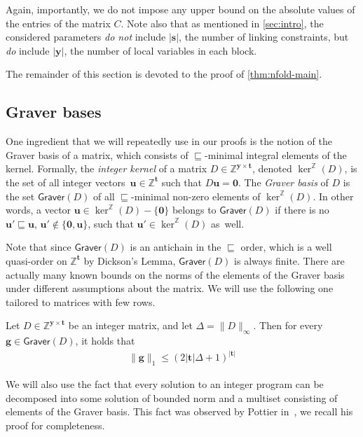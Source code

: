 \documentclass{article}
\renewcommand{\leq}{\leqslant}
\newcommand{\cfleq}{\sqsubseteq}
\newcommand{\Z}{\mathbb{Z}}
\newcommand{\tup}[1]{{\mathbf{#1}}}
\newcommand{\yy}{\tup y}
\newcommand{\sv}{\tup s}
\newcommand{\tv}{\tup t}
\renewcommand{\gg}{\tup g}
\newcommand{\uu}{\tup u}
\newcommand{\matrices}[3]{#1^{#2\times #3}}
\newcommand{\Graver}{\mathsf{Graver}}
\renewcommand{\setminus}{-}
\begin{document}
Again, importantly, we do not impose any upper bound on the absolute values of the entries of the matrix $C$. Note also that as mentioned in \cref{sec:intro}, the considered parameters {\em{do not}} include $|\sv|$, the number of linking constraints, but {\em{do}} include $|\yy|$, the number of local variables in each block.

The remainder of this section is devoted to the proof of \cref{thm:nfold-main}.

\subsection{Graver bases}\label{sec:Gravers}

One ingredient that we will repeatedly use in our proofs is the notion of the Graver basis of a matrix, which consists of $\cfleq$-minimal integral elements of the kernel. Formally, the {\em{integer kernel}} of a matrix $D \in \matrices{\Z}{\yy}{\tv}$, denoted $\ker^\Z(D)$, is the set of all integer vectors~$\uu \in \Z^{\tv}$ such that $D\uu = \mathbf{0}$. The {\em{Graver basis}} of $D$ is the set $\Graver(D)$ of all $\cfleq$-minimal non-zero elements of $\ker^\Z(D)$. In other words, a vector $\uu\in \ker^\Z(D)\setminus \{\mathbf{0}\}$ belongs to $\Graver(D)$ if there is no $\uu'\cfleq \uu$, $\uu'\notin \{\mathbf{0},\uu\}$, such that $\uu'\in \ker^\Z(D)$ as~well.

Note that since $\Graver(D)$ is an antichain in the $\cfleq$ order, which is a well quasi-order on $\Z^\tv$ by Dickson's Lemma, $\Graver(D)$ is always finite. There are actually many known bounds on the norms of the elements of the Graver basis under different assumptions about the matrix. We will use the following one tailored to matrices with few rows.

\begin{lemma}\label{lem:GraverBound}
Let $D \in \matrices{\Z}{\yy}{\tv}$ be an integer matrix, and let $\Delta=\|D\|_\infty$. Then for every $\gg\in \Graver(D)$, it holds that
\begin{align*}
    \|\gg\|_1 \leq (2|\tv|\Delta+1)^{|\tv|}
\end{align*}
\end{lemma}

We will also use the fact that every solution to an integer program can be decomposed into some solution of bounded norm and a multiset consisting of elements of the Graver basis. This fact was observed by Pottier in~\cite[Corollary~1]{Pottier91}, we recall his proof for completeness.
\end{document}

